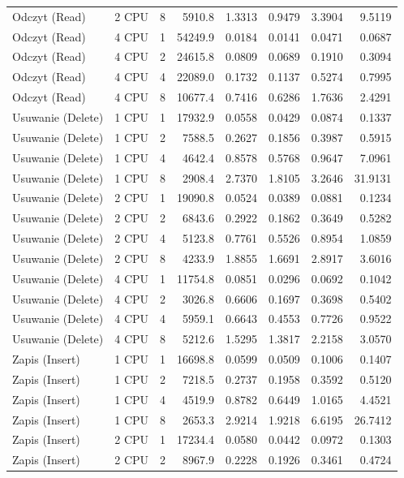 \begin{table}[ht]
{\begin{tabular}{llcrrrrr}
Odczyt (Read) & 2 CPU & 8 & 5910.8 & 1.3313 & 0.9479 & 3.3904 & 9.5119 \\
Odczyt (Read) & 4 CPU & 1 & 54249.9 & 0.0184 & 0.0141 & 0.0471 & 0.0687 \\
Odczyt (Read) & 4 CPU & 2 & 24615.8 & 0.0809 & 0.0689 & 0.1910 & 0.3094 \\
Odczyt (Read) & 4 CPU & 4 & 22089.0 & 0.1732 & 0.1137 & 0.5274 & 0.7995 \\
Odczyt (Read) & 4 CPU & 8 & 10677.4 & 0.7416 & 0.6286 & 1.7636 & 2.4291 \\
Usuwanie (Delete) & 1 CPU & 1 & 17932.9 & 0.0558 & 0.0429 & 0.0874 & 0.1337 \\
Usuwanie (Delete) & 1 CPU & 2 & 7588.5 & 0.2627 & 0.1856 & 0.3987 & 0.5915 \\
Usuwanie (Delete) & 1 CPU & 4 & 4642.4 & 0.8578 & 0.5768 & 0.9647 & 7.0961 \\
Usuwanie (Delete) & 1 CPU & 8 & 2908.4 & 2.7370 & 1.8105 & 3.2646 & 31.9131 \\
Usuwanie (Delete) & 2 CPU & 1 & 19090.8 & 0.0524 & 0.0389 & 0.0881 & 0.1234 \\
Usuwanie (Delete) & 2 CPU & 2 & 6843.6 & 0.2922 & 0.1862 & 0.3649 & 0.5282 \\
Usuwanie (Delete) & 2 CPU & 4 & 5123.8 & 0.7761 & 0.5526 & 0.8954 & 1.0859 \\
Usuwanie (Delete) & 2 CPU & 8 & 4233.9 & 1.8855 & 1.6691 & 2.8917 & 3.6016 \\
Usuwanie (Delete) & 4 CPU & 1 & 11754.8 & 0.0851 & 0.0296 & 0.0692 & 0.1042 \\
Usuwanie (Delete) & 4 CPU & 2 & 3026.8 & 0.6606 & 0.1697 & 0.3698 & 0.5402 \\
Usuwanie (Delete) & 4 CPU & 4 & 5959.1 & 0.6643 & 0.4553 & 0.7726 & 0.9522 \\
Usuwanie (Delete) & 4 CPU & 8 & 5212.6 & 1.5295 & 1.3817 & 2.2158 & 3.0570 \\
Zapis (Insert) & 1 CPU & 1 & 16698.8 & 0.0599 & 0.0509 & 0.1006 & 0.1407 \\
Zapis (Insert) & 1 CPU & 2 & 7218.5 & 0.2737 & 0.1958 & 0.3592 & 0.5120 \\
Zapis (Insert) & 1 CPU & 4 & 4519.9 & 0.8782 & 0.6449 & 1.0165 & 4.4521 \\
Zapis (Insert) & 1 CPU & 8 & 2653.3 & 2.9214 & 1.9218 & 6.6195 & 26.7412 \\
Zapis (Insert) & 2 CPU & 1 & 17234.4 & 0.0580 & 0.0442 & 0.0972 & 0.1303 \\
Zapis (Insert) & 2 CPU & 2 & 8967.9 & 0.2228 & 0.1926 & 0.3461 & 0.4724 \\

\end{tabular}}
\end{table}
